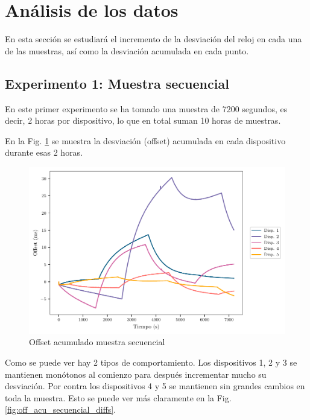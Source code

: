 \section{Análisis de los datos}

En esta sección se estudiará el incremento de la desviación del reloj en cada una de las muestras, así como la desviación acumulada en cada punto.

\subsection{Experimento 1: Muestra secuencial}

En este primer experimento se ha tomado una muestra de \SI{7200}{} segundos, es decir, \SI{2}{} horas por dispositivo, lo que en total suman \SI{10}{} horas de muestras.

En la Fig. \ref{fig:off_acu_secuencial} se muestra la desviación (offset) acumulada en cada dispositivo durante esas \SI{2}{} horas.

\begin{figure}[htpb!]
    \centering
    \includegraphics[scale=0.65]{../Python/plots/individual/offset_plot}
    \caption{Offset acumulado muestra secuencial}
    \label{fig:off_acu_secuencial}
\end{figure}

Como se puede ver hay 2 tipos de comportamiento. Los dispositivos 1, 2 y 3 se mantienen monótonos al comienzo para después incrementar mucho su desviación. Por contra los dispositivos 4 y 5 se mantienen sin grandes cambios en toda la muestra. Esto se puede ver más claramente en la Fig. \ref{fig:off_acu_secuencial_diffs}.

